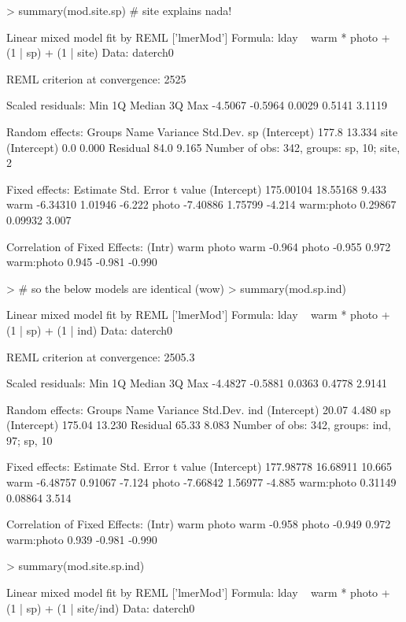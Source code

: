 \documentclass{article}
\begin{document}
\begin{Schunk}
\begin{Sinput}
> summary(mod.site.sp) # site explains nada!
\end{Sinput}
\begin{Soutput}
Linear mixed model fit by REML ['lmerMod']
Formula: lday ~ warm * photo + (1 | sp) + (1 | site)
   Data: daterch0

REML criterion at convergence: 2525

Scaled residuals: 
    Min      1Q  Median      3Q     Max 
-4.5067 -0.5964  0.0029  0.5141  3.1119 

Random effects:
 Groups   Name        Variance Std.Dev.
 sp       (Intercept) 177.8    13.334  
 site     (Intercept)   0.0     0.000  
 Residual              84.0     9.165  
Number of obs: 342, groups:  sp, 10; site, 2

Fixed effects:
             Estimate Std. Error t value
(Intercept) 175.00104   18.55168   9.433
warm         -6.34310    1.01946  -6.222
photo        -7.40886    1.75799  -4.214
warm:photo    0.29867    0.09932   3.007

Correlation of Fixed Effects:
           (Intr) warm   photo 
warm       -0.964              
photo      -0.955  0.972       
warm:photo  0.945 -0.981 -0.990
\end{Soutput}
\begin{Sinput}
> # so the below models are identical (wow)
> summary(mod.sp.ind)
\end{Sinput}
\begin{Soutput}
Linear mixed model fit by REML ['lmerMod']
Formula: lday ~ warm * photo + (1 | sp) + (1 | ind)
   Data: daterch0

REML criterion at convergence: 2505.3

Scaled residuals: 
    Min      1Q  Median      3Q     Max 
-4.4827 -0.5881  0.0363  0.4778  2.9141 

Random effects:
 Groups   Name        Variance Std.Dev.
 ind      (Intercept)  20.07    4.480  
 sp       (Intercept) 175.04   13.230  
 Residual              65.33    8.083  
Number of obs: 342, groups:  ind, 97; sp, 10

Fixed effects:
             Estimate Std. Error t value
(Intercept) 177.98778   16.68911  10.665
warm         -6.48757    0.91067  -7.124
photo        -7.66842    1.56977  -4.885
warm:photo    0.31149    0.08864   3.514

Correlation of Fixed Effects:
           (Intr) warm   photo 
warm       -0.958              
photo      -0.949  0.972       
warm:photo  0.939 -0.981 -0.990
\end{Soutput}
\begin{Sinput}
> summary(mod.site.sp.ind)
\end{Sinput}
\begin{Soutput}
Linear mixed model fit by REML ['lmerMod']
Formula: lday ~ warm * photo + (1 | sp) + (1 | site/ind)
   Data: daterch0


\end{Soutput}
\end{Schunk}
\end{document}
